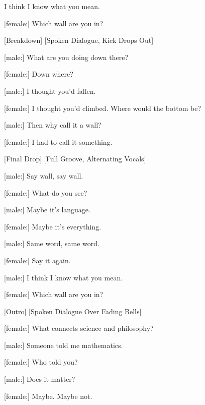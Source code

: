 \begin{lyrics}
[male:]
I think I know what you mean.

[female:]
Which wall are you in?

[Breakdown]
[Spoken Dialogue, Kick Drops Out]

[male:]
What are you doing down there?

[female:]
Down where?

[male:]
I thought you’d fallen.

[female:]
I thought you’d climbed.
Where would the bottom be?

[male:]
Then why call it a wall?

[female:]
I had to call it something.

[Final Drop]
[Full Groove, Alternating Vocals]

[male:]
Say wall, say wall.

[female:]
What do you see?

[male:]
Maybe it’s language.

[female:]
Maybe it’s everything.

[male:]
Same word, same word.

[female:]
Say it again.

[male:]
I think I know what you mean.

[female:]
Which wall are you in?

[Outro]
[Spoken Dialogue Over Fading Bells]

[female:]
What connects science and philosophy?

[male:]
Someone told me mathematics.

[female:]
Who told you?

[male:]
Does it matter?

[female:]
Maybe. Maybe not.
\end{lyrics}

